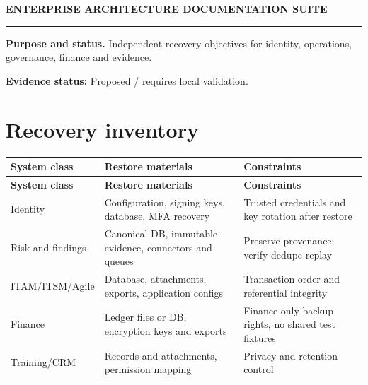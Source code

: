\documentclass[10pt,letterpaper]{article}
\begin{document}
\begin{center}
{\large\bfseries\color{teal} ENTERPRISE ARCHITECTURE DOCUMENTATION SUITE}\par
{}\par
{}\par
\end{center}
\vspace{8pt}\hrule\vspace{12pt}
\textbf{Purpose and status.} Independent recovery objectives for identity, operations, governance, finance and evidence.\par
\textbf{Evidence status:} Proposed / requires local validation.\par
\section{Recovery inventory}
\small\begin{longtable}{>{\raggedright\arraybackslash}p{}>{\raggedright\arraybackslash}p{}>{\raggedright\arraybackslash}p{}}
\toprule
\textbf{System class} & \textbf{Restore materials} & \textbf{Constraints}\\
\midrule\endfirsthead
\toprule
\textbf{System class} & \textbf{Restore materials} & \textbf{Constraints}\\
\midrule\endhead
Identity & Configuration, signing keys, database, MFA recovery & Trusted credentials and key rotation after restore\\
Risk and findings & Canonical DB, immutable evidence, connectors and queues & Preserve provenance; verify dedupe replay\\
ITAM/ITSM/Agile & Database, attachments, exports, application configs & Transaction-order and referential integrity\\
Finance & Ledger files or DB, encryption keys and exports & Finance-only backup rights, no shared test fixtures\\
Training/CRM & Records and attachments, permission mapping & Privacy and retention control\\
\bottomrule
\end{longtable}
\normalsize
\end{document}
